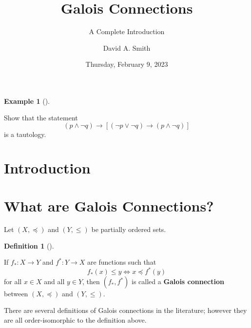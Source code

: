 \documentclass[
  twoside,
  12pt,
  letterpaper,
  fleqn]{article}
\title{Galois Connections}
\subtitle{A Complete Introduction}
\author{David A. Smith}
\date{Thursday, February 9, 2023}
\renewcommand*\contentsname{Table of contents}
\newcommand\contentsname{Table of contents}
\theoremstyle{definition}
\newtheorem{example}{Example}[section]
\theoremstyle{definition}
\newtheorem{definition}{Definition}[section]
\theoremstyle{plain}
\theoremstyle{remark}
\begin{document}
\maketitle
\ifdefined\Shaded\renewenvironment{Shaded}{\begin{tcolorbox}[enhanced, frame hidden, borderline west={3pt}{0pt}{shadecolor}, sharp corners, boxrule=0pt, interior hidden, breakable]}{\end{tcolorbox}}\fi

\renewcommand*\contentsname{Table of contents}
{
\setcounter{tocdepth}{3}
\tableofcontents
}
\begin{example}[]\protect\hypertarget{exm-tautology-2}{}\label{exm-tautology-2}

Show that the statement \begin{equation}
\label{scsex}
(p\land \neg q)\rightarrow [(\neg p\lor \neg q)\rightarrow (p\land \neg q)]
\end{equation} is a tautology.

\end{example}

\hypertarget{introduction}{%
\section{Introduction}\label{introduction}}

\hypertarget{what-are-galois-connections}{%
\section{What are Galois
Connections?}\label{what-are-galois-connections}}

Let \((X,\preceq)\) and \((Y,\leqslant)\) be partially ordered sets.

\begin{definition}[]\protect\hypertarget{def-galois-connection}{}\label{def-galois-connection}

If \(f_*:X\to Y\) and \(f^*:Y\to X\) are functions such that
\begin{equation}
\label{gc}
f_*(x)\leqslant y \Longleftrightarrow x\preceq f^*(y)
\end{equation} for all \(x\in X\) and all \(y\in Y\), then
\((f_*, f^*)\) is called a \textbf{Galois connection} between
\((X,\preceq)\) and \((Y,\leqslant)\).

\end{definition}

There are several definitions of Galois connections in the literature;
however they are all order-isomorphic to the definition above.
\end{document}
